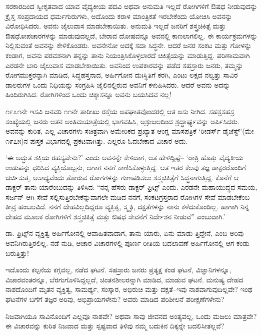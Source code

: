 ಸರಕಾರದಿಂದ ಸ್ವೀಕೃತವಾದ ಯಾವ ವೈದ್ಯಕೀಯ ಪದವಿ ಅಥವಾ ಅನುಮತಿ ಇಲ್ಲದೆ ರೋಗಿಗಳಿಗೆ ಔಷಧ ನೀಡುವುದನ್ನು ಕ್ರೈಸ್ತ ಸಂಪ್ರದಾಯದ ಧರ್ಮಗುರುಗಳು, ಅದೊಂದು ಕರಾಳ ಮಾಂತ್ರಿಕತೆ ಇರಬೇಕೆಂದು ಯೋಚಿಸಿ ಅವನನ್ನು ವಿರೋಧಿಸಿದರು. ಅವನು ಜೈಲುವಾಸ ಮಾಡಬೇಕಾಯಿತು. ಅನುಮತಿ ಇಲ್ಲದೆ ಜನರಿಗೆ ಶಸ್ತ್ರಚಿಕಿತ್ಸೆ ಮತ್ತು ಔಷಧೋಪಚಾರಗಳನ್ನು ಮಾಡುವುದಲ್ಲದೆ, ಬೇರಾವ ದೋಷವನ್ನೂ ಅವನಲ್ಲಿ ಕಾಣಲಾಗಲಿಲ್ಲ. ಈ ಕಾರ್ಯಕ್ರಮಗಳನ್ನು ನಿಲ್ಲಿಸುವಂತೆ ಅವನನ್ನು ಕೇಳಿಕೊಂಡರು. ಅವನೇನೋ ಅದಕ್ಕೆ ಸದಾ ಸಿದ್ಧನೇ. ಆದರೆ ಜನರ ಸಂಕಟ ಮತ್ತು ಗೋಳನ್ನು ಕಂಡಾಗ, ಅವನು ಪರವಶನಾಗಿ ತನ್ನನ್ನು ತಾನು ನಿಯಂತ್ರಿಸಿಕೊಳ್ಳಲಾರದೆ ಚಿಕಿತ್ಸೆಯನ್ನು ಮಾಡುತ್ತಿದ್ದ. ಪರಿಣಾಮವಾಗಿ ಎರಡನೇ ಬಾರಿ ಜೈಲುವಾಸ ಮಾಡಬೇಕಾಯಿತು. ಅವನಿಂದ ಉಪಕಾರವನ್ನು ಪಡೆದ ಸಹಸ್ರಾರು ಜನರು, ತಮ್ಮನ್ನು ರೋಗಮುಕ್ತರನ್ನಾಗಿ ಮಾಡಿದ, ಸಿದ್ಧಹಸ್ತನಾದ, ಅರ್ಹಿಗೋನ ದುಃಸ್ಥಿತಿಗೆ ಕರಗಿ, ಎಂಟು ಲಕ್ಷದ ನಲ್ವತ್ತು ಸಾವಿರ ಡಾಲರುಗಳ ಒಂದು ನಿಧಿಯನ್ನು ಸಂಗ್ರಹಿಸಿ ಜೈಲಿನಲ್ಲಿರುವ ಅವನಿಗೆ ಕಳುಹಿಸಿದರು. ಆದರೆ ಅವನು ಅದನ್ನು ಹಿಂದಿರುಗಿಸಿದ. ರೋಗಿಗಳಿಂದ ಒಂದು ಚಿಕ್ಕಾಸನ್ನೂ ಅವನು ಬಯಸಿದವ ನಲ್ಲ!

೧೯೭೧ನೇ ಇಸವಿ ಜನವರಿ ೧೧ನೇ ತಾರೀಖು ರಸ್ತೆಯ ಅಪಘಾತವೊಂದರಲ್ಲಿ ಆತ ಅಸು ನೀಗಿದ. ಸಹಸ್ರಸಹಸ್ರ ಸಂಖ್ಯೆಯಲ್ಲಿ ಜನರು ಆತನ ಅಂತಿಮಯಾತ್ರೆಯಲ್ಲಿ ಭಾಗವಹಿಸಿ, ಅಶ್ರುಜಲದಿಂದ ಶ್ರದ್ಧಾರ್ಘ್ಯವನ್ನು ಅರ್ಪಿಸಿದರು. ಅವನನ್ನು ಕುರಿತ, ಎಲ್ಲ ವಿಚಾರಗಳು ಸಚಿತ್ರವಾಗಿ ಅಮೇರಿಕದ ಪ್ರಖ್ಯಾತ ಆಂಗ್ಲ ಮಾಸಪತ್ರಿಕೆ ‘ರೀಡರ್ಸ್ ಡೈಜೆಸ್ಟ್​’(ಮೇ ೧೯೭೫)ನ ಪುಸ್ತಕ ವಿಭಾಗದಲ್ಲಿ ಪ್ರಕಟವಾಗಿತ್ತು. ಎಲ್ಲರೂ ಓದಬೇಕಾದ ವಿಚಾರ ಅದು.

‘ಈ ಅದ್ಭುತ ಶಕ್ತಿಯ ರಹಸ್ಯವೇನು?’ ಎಂದು ಅವನನ್ನೇ ಕೇಳಿದಾಗ, ಆತ ಹೇಳಿದ್ದಿಷ್ಟೆ– ‘ರಾತ್ರಿ ಹೊತ್ತು ವೈದ್ಯಕೀಯ ಉಡುಪನ್ನು ಧರಿಸಿದ ವ್ಯಕ್ತಿಯೊಬ್ಬನು, ಆಗಾಗ ನನಗೆ ಕಾಣಿಸಿಕೊಳ್ಳುತ್ತಿದ್ದ. ಆತ ಇತರ ಕೆಲವು ತಜ್ಞ ಡಾಕ್ಟರರೊಂದಿಗೆ ಚರ್ಚಿಸುತ್ತ, ಅಸಾಧ್ಯವೆಂದು ತೋರುವ ರೋಗಗಳನ್ನು ಗುಣಪಡಿಸಲು ಶಸ್ತ್ರಚಿಕಿತ್ಸೆಗೆ ಸಿದ್ಧನಾಗುತ್ತಿದ್ದ. ಕೊನೆಗೆ ಆ ಡಾಕ್ಟರ್ ತಾನು ಯಾರೆಂಬುದನ್ನು ತಿಳಿಸಿದ: “ನನ್ನ ಹೆಸರು ಡಾಕ್ಟರ್ ಫ್ರಿಟ್ಸ್ ಎಂದು. ಎರಡನೇ ಮಹಾಯುದ್ಧದ ಸಮಯ, ಸರ್ಜನ್ ಆಗಿ ಸೇವೆ ಸಲ್ಲಿಸುತ್ತಿರಬೇಕೆನ್ನುವಾಗಲೇ ಮಡಿದ ನನಗೆ, ಸಂಕಟಗ್ರಸ್ತರಾದ ರೋಗಿಗಳ ಸೇವೆ ಮಾಡಬೇಕೆಂಬ ತೀವ್ರ ಹಂಬಲವಿದೆ. ನನಗೆ ದೇಹವಿಲ್ಲದಿದ್ದರೂ ವ್ಯಕ್ತಿತ್ವ, ಸ್ಮೃತಿ, ದಕ್ಷತೆಗಳನ್ನು ನಾನು ಕಳೆದುಕೊಂಡಿಲ್ಲ. ಹಾಗಾಗಿ ನಿನ್ನ ದೇಹದ ಮೂಲಕ ರೋಗಿಗಳಿಗೆ ಶಸ್ತ್ರಚಿಕಿತ್ಸೆ ಮತ್ತು ಔಷಧ ಸೇವನೆಗೆ ನಿರ್ದೇಶನ ನೀಡುವೆ” ಎಂಬುದಾಗಿ.’

ಡಾ. ಫ್ರಿಟ್ಸ್​ನ ವ್ಯಕ್ತಿತ್ವ ಅರ್ಹಿಗೋನಲ್ಲಿ ಆವಾಹಿತವಾದಾಗ, ತಾನು ಯಾರು, ಏನು ಮಾಡು ತ್ತಿದ್ದೇನೆ, ಎಂಬ ಅರಿವು ಅವನಿಗಿರುತ್ತಿರಲಿಲ್ಲ. ನಡೆ ನುಡಿ, ಆಚಾರ ವಿಚಾರಗಳಲ್ಲಿ ಪೂರ್ಣ ರೀತಿಯ ಬದಲಾವಣೆ ಅರ್ಹಿಗೋನಲ್ಲಿ ಆಗ ಕಂಡು ಬರುತ್ತಿತ್ತು!

ಇದೊಂದು ಕಲ್ಪನೆಯ ಕಗ್ಗವಲ್ಲ, ನಡೆದ ಘಟನೆ. ಸಹಸ್ರಾರು ಜನರು ಪ್ರತ್ಯಕ್ಷ ಕಂಡ ಘಟನೆ, ವಿಜ್ಞಾನಿಗಳನ್ನೂ, ವಿಚಾರವಂತರನ್ನೂ, ಬೆರಗುಗೊಳಿಸಿದ್ದಲ್ಲದೆ, ಚಿಂತನಶೀಲರನ್ನಾಗಿ ಮಾಡಿದ, ಮಾಡುವ ಘಟನೆ. ಮನುಷ್ಯ ದೇಹದ ನಾಶದೊಂದಿಗೆ ಮೃತನ ವ್ಯಕ್ತಿತ್ವ, ಸಾಮರ್ಥ್ಯ, ಸಂಸ್ಕಾರ, ಅಭಿರುಚಿ ಮತ್ತು ದಕ್ಷತೆ–ಇವು ನಾಶವಾಗುವುದಿಲ್ಲವೇ? ಇಂಥ ಘಟನೆಗಳ ಬಗೆಗೆ ತಜ್ಞರ ಅರಿವು, ಅಭಿಪ್ರಾಯಗಳೇನು? ಅವರು ಮಾಡಿದ ಪರಿಶೀಲನೆ ಪರೀಕ್ಷಣೆಗಳೇನು?

ನಿಜವಾಗಿಯೂ ಸಾವಿನೊಂದಿಗೆ ಎಲ್ಲವೂ ನಾಶವೇ? ಅಥವಾ ಸಾವು ಜೀವನದ ಅಂತ್ಯವಲ್ಲ, ಒಂದು ಮಜಲು ಮಾತ್ರವೇ? ಈ ವಿಚಾರವನ್ನು ಕುರಿತ ನಿಜವಾದ ಮತ್ತು ಸ್ಪಷ್ಟವಾದ ತಿಳಿವು ನಮ್ಮ ಬದುಕಿನ ದಿಕ್ಕನ್ನೇ ಬದಲಿಸೀತಲ್ಲವೆ?


